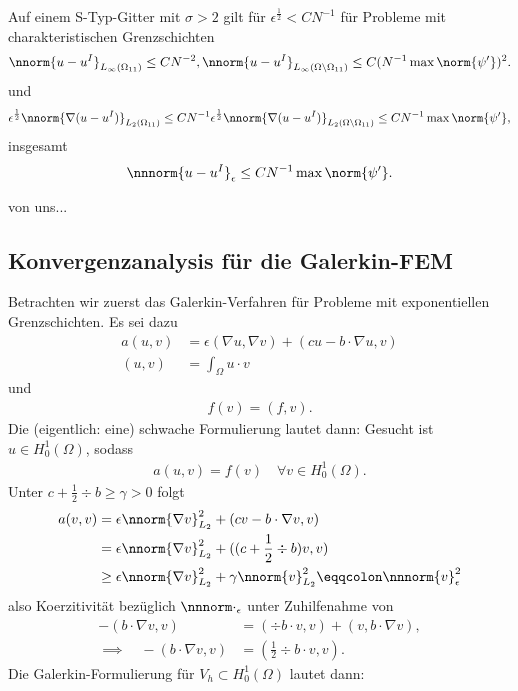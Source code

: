 \begin{satz}\label{thm:7-12}
  Auf einem S-Typ-Gitter mit $\sigma>2$ gilt für $\epsilon^{\frac 12} < CN^{-1}$ für Probleme mit charakteristischen Grenzschichten
  \begin{align*}
    \nnorm{u - u^{I}}_{L_{\infty}(\Omega_{11})} \leq C N^{-2},
    \nnorm{u - u^{I}}_{L_{\infty}(\Omega\setminus\Omega_{11})} \leq C (N^{-1} \max\norm{\psi'})^{2}. 
  \end{align*}
und
\begin{align*}
  \epsilon^{\frac 12} \nnorm{\nabla(u - u^{I})}_{L_{2}(\Omega_{11})} \leq C N^{-1}  \epsilon^{\frac 12} \nnorm{\nabla(u - u^{I})}_{L_{2}(\Omega\setminus\Omega_{11})} \leq C N^{-1} \max \norm{\psi'}, 
\end{align*}
insgesamt
\begin{align*}
  \nnnorm{u - u^{I}}_{\epsilon} \leq C N^{-1} \max \norm{\psi'}. 
\end{align*}
\end{satz}
\begin{beweis}
  von uns...
\end{beweis}


\subsection{Konvergenzanalysis für die Galerkin-FEM}
\label{sec:konv-fur-die}
Betrachten wir zuerst das Galerkin-Verfahren für Probleme mit exponentiellen Grenzschichten. Es sei dazu
\begin{align*}
  a(u, v) &= \epsilon(\nabla u, \nabla v) + (cu -b \cdot \nabla u, v)\\
  (u, v) &= \int_{\Omega} u\cdot v
\end{align*}
und
\begin{align*}
  f(v) = (f, v). 
\end{align*}
Die (eigentlich: eine) schwache Formulierung lautet dann: Gesucht ist $u \in H_{0}^{1}(\Omega)$, sodass
\begin{align*}
  a(u, v) = f(v) \quad \forall v \in H_{0}^{1}(\Omega). 
\end{align*}
Unter $c + \frac 12 \div b \geq \gamma > 0$ folgt
\begin{align*}
  a(v, v) &= \epsilon \nnorm{\nabla v}_{L_{2}}^{2} + (c v - b \cdot \nabla v, v)\\
  &= \epsilon \nnorm{\nabla v}_{L_{2}}^{2} + ((c + \frac 12 \div b)v, v)\\
& \geq \epsilon \nnorm{\nabla v}_{L_{2}}^{2} + \gamma\nnorm{v}_{L_{2}}^{2} \eqqcolon \nnnorm{v}^{2}_{\epsilon}
\end{align*}
also Koerzitivität bezüglich $\nnnorm \cdot _{\epsilon}$ unter Zuhilfenahme von
\begin{align*}
  - (b \cdot \nabla v, v) &= (\div b \cdot v, v) + (v, b \cdot \nabla v),\\
\implies \quad   - (b \cdot \nabla v, v) &= (\frac 12 \div b \cdot v, v).
\end{align*}
Die Galerkin-Formulierung für $V_{h} \subset H_{0}^{1}(\Omega)$ lautet dann: 

